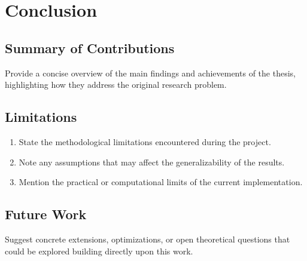 \chapter{Conclusion}

\section{Summary of Contributions}

Provide a concise overview of the main findings and achievements of the thesis, highlighting how they address the original research problem.

\section{Limitations}

\begin{enumerate}
    \item State the methodological limitations encountered during the project.
    \item Note any assumptions that may affect the generalizability of the results.
    \item Mention the practical or computational limits of the current implementation.
\end{enumerate}

\section{Future Work}

Suggest concrete extensions, optimizations, or open theoretical questions that could be explored building directly upon this work.